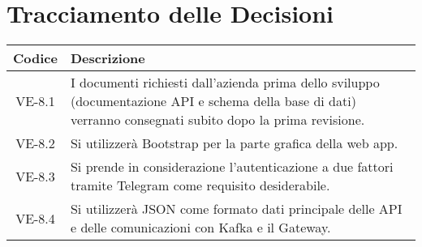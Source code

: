\section*{Tracciamento delle Decisioni}

\begin{center}
	\begin{longtable}{|c|p{14.5cm}|}
	\hline
	\rowcolor{lighter-grayer}
	\textbf{Codice} & \textbf{Descrizione} \\
	\hline
	\endfirsthead
	
	\hline
	VE-8.1 & I documenti richiesti dall'azienda prima dello sviluppo (documentazione API e schema della base di dati) verranno consegnati subito dopo la prima revisione. \\
	\hline
	VE-8.2 & Si utilizzerà Bootstrap per la parte grafica della web app. \\
	\hline
	VE-8.3 & Si prende in considerazione l'autenticazione a due fattori tramite Telegram come requisito desiderabile. \\
	\hline
	VE-8.4 & Si utilizzerà JSON come formato dati principale delle API e delle comunicazioni con Kafka e il Gateway. \\
	\hline
	\end{longtable}
\end{center}